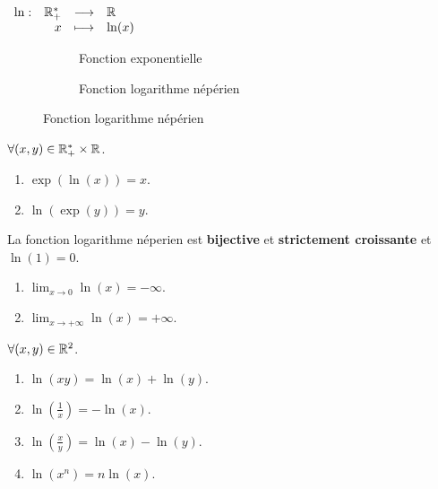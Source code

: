 \begin{definition}
	\begin{center}
		$
		\begin{array}{rrcl} \ln : & \mathbb{R}_+^* & \longrightarrow & \mathbb{R} \\ & x & \longmapsto & \ln(x) \end{array}
		$
	\end{center}
\end{definition}

\begin{figure}[!h]
	\centering
	\begin{subfigure}{0.45\textwidth}
		\caption{Fonction exponentielle}
	\end{subfigure}
	\begin{subfigure}{0.45\textwidth}
		\caption{Fonction logarithme népérien}
	\end{subfigure}
\end{figure}

\begin{proposition}
	$\forall (x, y) \in \mathbb{R}_+^* \times \mathbb{R}$.
    \begin{multicols}{2}
        \begin{enumerate}
            \item $\exp(\ln(x)) = x$.
            \item $\ln(\exp(y)) = y$.
        \end{enumerate}
    \end{multicols}
\end{proposition}

\begin{proposition}
	La fonction logarithme néperien est \textbf{bijective} et \textbf{strictement croissante} et $\ln(1) = 0$.
    \begin{enumerate}
            \item $\lim_{x \to 0} \ln(x) = -\infty$.
            \item $\lim_{x \to +\infty} \ln(x) = +\infty$.
        \end{enumerate}
    \noindent $\forall (x, y) \in \mathbb{R}^2$.
    \begin{enumerate}
            \item $\ln(xy) = \ln(x) + \ln(y)$.
            \item $\ln(\frac{1}{x}) = -\ln(x)$.
            \item $\ln(\frac{x}{y}) = \ln(x) - \ln(y)$.
            \item $\ln(x^n) = n\ln(x)$.
        \end{enumerate}
\end{proposition}

